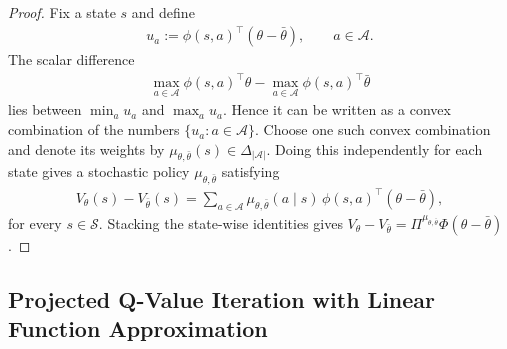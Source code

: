 \documentclass[letterpaper]{article}
\numberwithin{equation}{section}
\begin{document}
\begin{proof}
Fix a state $s$ and define
\begin{align*}
  u_a:=\phi(s,a)^\top(\theta-\bar\theta),
  \qquad a\in\mathcal A.
\end{align*}
The scalar difference
\begin{align*}
  \max_{a\in\mathcal A}\phi(s,a)^\top\theta
  -\max_{a\in\mathcal A}\phi(s,a)^\top\bar\theta
\end{align*}
lies between $\min_a u_a$ and $\max_a u_a$. Hence it can be written as a convex
combination of the numbers $\{u_a:a\in\mathcal A\}$. Choose one such convex
combination and denote its weights by $\mu_{\theta,\bar\theta}(s)\in\Delta_{|\mathcal A|}$.
Doing this independently for each state gives a stochastic policy
$\mu_{\theta,\bar\theta}$ satisfying
\begin{align*}
  V_\theta(s)-V_{\bar\theta}(s)
  =\sum_{a\in\mathcal A}\mu_{\theta,\bar\theta}(a\mid s)\,
  \phi(s,a)^\top(\theta-\bar\theta),
\end{align*}
for every $s\in\mathcal S$. Stacking the state-wise identities gives
$V_\theta-V_{\bar\theta}=\Pi^{\mu_{\theta,\bar\theta}}\Phi(\theta-\bar\theta)$.
\end{proof}

\subsection{Projected Q-Value Iteration with Linear Function Approximation}
\label{sec:linear_fa_projected_error_system}
\label{app:pqvi-lfa}
\end{document}
